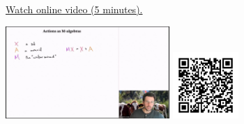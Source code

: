 
\begin{minipage}{10cm}
    \href{https://act4e-spring21.netlify.app/videos/spring2021-monads-b:actions-as-algebras.html}{Watch online video (5 minutes).}
        
    \href{https://act4e-spring21.netlify.app/videos/spring2021-monads-b:actions-as-algebras.html}{\includegraphics[height=3.5cm]{spring2021-monads-b:actions-as-algebras/thumbnails.jpg}}
    \href{https://act4e-spring21.netlify.app/videos/spring2021-monads-b:actions-as-algebras.html}{\includegraphics[height=2.5cm]{spring2021-monads-b:actions-as-algebras/qrcode.png}}
\end{minipage}
